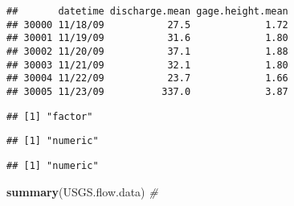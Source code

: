 \documentclass[]{article}
\newenvironment{Shaded}{\begin{snugshade}}{\end{snugshade}}
\newcommand{\CommentTok}[1]{\textcolor[rgb]{0.56,0.35,0.01}{\textit{#1}}}
\newcommand{\KeywordTok}[1]{\textcolor[rgb]{0.13,0.29,0.53}{\textbf{#1}}}
\newcommand{\NormalTok}[1]{#1}
\newcommand{\OperatorTok}[1]{\textcolor[rgb]{0.81,0.36,0.00}{\textbf{#1}}}
\begin{document}
\begin{verbatim}
##       datetime discharge.mean gage.height.mean
## 30000 11/18/09           27.5             1.72
## 30001 11/19/09           31.6             1.80
## 30002 11/20/09           37.1             1.88
## 30003 11/21/09           32.1             1.80
## 30004 11/22/09           23.7             1.66
## 30005 11/23/09          337.0             3.87
\end{verbatim}

\begin{Shaded}
\end{Shaded}

\begin{verbatim}
## [1] "factor"
\end{verbatim}

\begin{Shaded}
\end{Shaded}

\begin{verbatim}
## [1] "numeric"
\end{verbatim}

\begin{Shaded}
\end{Shaded}

\begin{verbatim}
## [1] "numeric"
\end{verbatim}

\begin{Shaded}
\begin{Highlighting}[]
\KeywordTok{summary}\NormalTok{(USGS.flow.data) }\CommentTok{#}
\end{Highlighting}
\end{Shaded}
\end{document}
